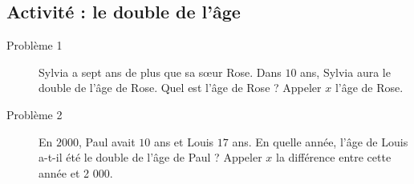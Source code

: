 
\subsection*{Activité : le double de l'âge}

\begin{description}
    \item[Problème 1] Sylvia a sept ans de plus que sa sœur Rose. Dans $10$ ans, Sylvia aura le double de l'âge de Rose. Quel est l'âge de Rose ? Appeler $x$ l'âge de Rose.

    \item[Problème 2] En $2000$, Paul avait $10$ ans et Louis $17$ ans. En quelle année, l'âge de Louis
a-t-il été le double de l'âge de Paul ? Appeler $x$ la différence entre cette année et 2 000.
\end{description}
